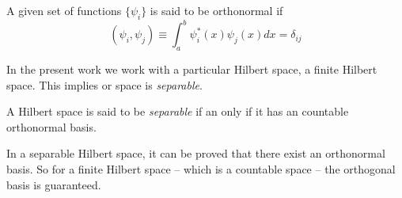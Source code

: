 \begin{definition}[Orthonormality]
A given set of functions $\{\psi_{i}\}$ is said to be orthonormal if
\begin{equation}
    \left(\psi_{i}, \psi_{j}\right) \equiv \int_{a}^{b} \psi_{i}^{*}(x)\psi_{j}(x) dx = \delta_{ij} 
\end{equation}
\end{definition}

In the present work we work with a particular Hilbert space, a finite Hilbert space. This implies or space is \textit{separable}.
\begin{definition}[Separable]
    A Hilbert space is said to be \textit{separable} if an only if it has an countable orthonormal basis.
\end{definition}
\begin{flushleft}
In a separable Hilbert space, it can be proved that there exist an orthonormal basis. So for a finite Hilbert space -- which is a countable space -- the orthogonal basis is guaranteed.
\end{flushleft}
